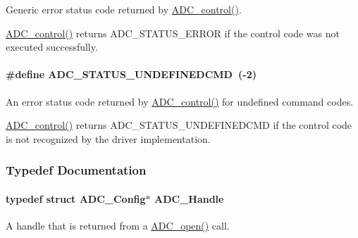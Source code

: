 Generic error status code returned by \hyperlink{_a_d_c_8h_af4be7e5e4f5cc931f4501a542d689c32}{A\+D\+C\+\_\+control()}. 

\hyperlink{_a_d_c_8h_af4be7e5e4f5cc931f4501a542d689c32}{A\+D\+C\+\_\+control()} returns A\+D\+C\+\_\+\+S\+T\+A\+T\+U\+S\+\_\+\+E\+R\+R\+O\+R if the control code was not executed successfully. 
\paragraph[{A\+D\+C\+\_\+\+S\+T\+A\+T\+U\+S\+\_\+\+U\+N\+D\+E\+F\+I\+N\+E\+D\+C\+M\+D}]{\setlength{\rightskip}{0pt plus 5cm}\#define A\+D\+C\+\_\+\+S\+T\+A\+T\+U\+S\+\_\+\+U\+N\+D\+E\+F\+I\+N\+E\+D\+C\+M\+D~(-\/2)}\label{_a_d_c_8h_a704a8cd95bdee94b0f61f06566062e8c}


An error status code returned by \hyperlink{_a_d_c_8h_af4be7e5e4f5cc931f4501a542d689c32}{A\+D\+C\+\_\+control()} for undefined command codes. 

\hyperlink{_a_d_c_8h_af4be7e5e4f5cc931f4501a542d689c32}{A\+D\+C\+\_\+control()} returns A\+D\+C\+\_\+\+S\+T\+A\+T\+U\+S\+\_\+\+U\+N\+D\+E\+F\+I\+N\+E\+D\+C\+M\+D if the control code is not recognized by the driver implementation. 

\subsubsection{Typedef Documentation}
\paragraph[{A\+D\+C\+\_\+\+Handle}]{\setlength{\rightskip}{0pt plus 5cm}typedef struct {\bf A\+D\+C\+\_\+\+Config}$\ast$ {\bf A\+D\+C\+\_\+\+Handle}}\label{_a_d_c_8h_ac98b1222559c172df43505d672e1376c}


A handle that is returned from a \hyperlink{_a_d_c_8h_a9f3e5f311cda4df63e70660651b9314e}{A\+D\+C\+\_\+open()} call. 

